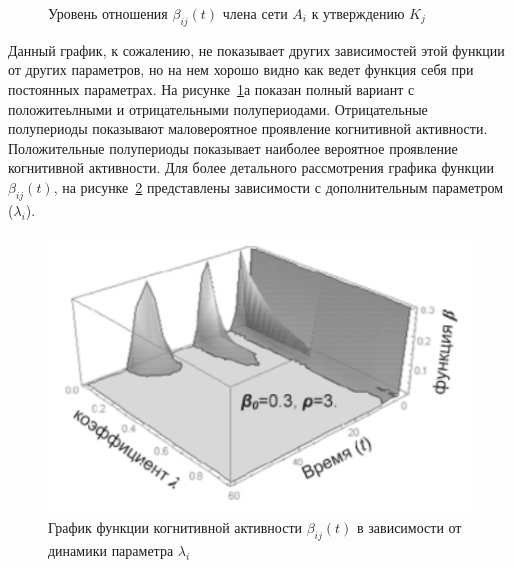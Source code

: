 \begin{figure}[h!]
\begin{minipage}[h]{0.4\linewidth}
    \end{minipage}
    \caption{Уровень отношения $\beta_{ij}(t)$ члена сети $A_{i}$ к утверждению $K_{j}$~\citep{pilkevich2015model}}
    \label{fig:graphic_beta}
\end{figure}

Данный график, к сожалению, не показывает других зависимостей этой функции от других параметров, но
на нем хорошо видно как ведет функция себя при постоянных параметрах.
На рисунке~\ref{fig:graphic_beta}а показан полный вариант с положитеьлными и отрицательными полупериодами.
Отрицательные полупериоды показывают маловероятное проявление когнитивной активности.
Положительные полупериоды показывает наиболее вероятное проявление когнитивной активности.
Для более детального рассмотрения графика функции $\beta_{ij}(t)$, на рисунке~\ref{fig:beta_another_param}
представлены зависимости с дополнительным параметром ($\lambda_{i}$).
\begin{figure}[h!]
    \centering
    \captionsetup{justification=centering}
    \includegraphics[width=0.7\linewidth]{pictures/graphic_beta_anotherparam.png}
    \caption{График функции когнитивной активности $\beta_{ij}(t)$ в зависимости от динамики параметра $\lambda_{i}$~\citep{pilkevich2015model}}
    \label{fig:beta_another_param}
\end{figure}

